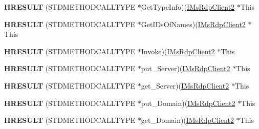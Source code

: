 \begin{DoxyCompactItemize}
{\bfseries H\+R\+E\+S\+U\+LT} (S\+T\+D\+M\+E\+T\+H\+O\+D\+C\+A\+L\+L\+T\+Y\+PE $\ast$Get\+Type\+Info)(\hyperlink{interface_m_s_t_s_c_lib_1_1_i_ms_rdp_client2}{I\+Ms\+Rdp\+Client2} $\ast$This
\item 
\mbox{\label{struct_m_s_t_s_c_lib_1_1_i_ms_rdp_client2_vtbl_aaee47cd5a7e23b764e80e9a08243ff5a}} 
{\bfseries H\+R\+E\+S\+U\+LT} (S\+T\+D\+M\+E\+T\+H\+O\+D\+C\+A\+L\+L\+T\+Y\+PE $\ast$Get\+I\+Ds\+Of\+Names)(\hyperlink{interface_m_s_t_s_c_lib_1_1_i_ms_rdp_client2}{I\+Ms\+Rdp\+Client2} $\ast$This
\item 
\mbox{\label{struct_m_s_t_s_c_lib_1_1_i_ms_rdp_client2_vtbl_a5ba6d3eae8ed0eeca2248aef7949bd52}} 
{\bfseries H\+R\+E\+S\+U\+LT} (S\+T\+D\+M\+E\+T\+H\+O\+D\+C\+A\+L\+L\+T\+Y\+PE $\ast$Invoke)(\hyperlink{interface_m_s_t_s_c_lib_1_1_i_ms_rdp_client2}{I\+Ms\+Rdp\+Client2} $\ast$This
\item 
\mbox{\label{struct_m_s_t_s_c_lib_1_1_i_ms_rdp_client2_vtbl_aab5809642581f36d23bfc2488d74fad4}} 
{\bfseries H\+R\+E\+S\+U\+LT} (S\+T\+D\+M\+E\+T\+H\+O\+D\+C\+A\+L\+L\+T\+Y\+PE $\ast$put\+\_\+\+Server)(\hyperlink{interface_m_s_t_s_c_lib_1_1_i_ms_rdp_client2}{I\+Ms\+Rdp\+Client2} $\ast$This
\item 
\mbox{\label{struct_m_s_t_s_c_lib_1_1_i_ms_rdp_client2_vtbl_aa299868fc3a59a6c72de00e0975ca85e}} 
{\bfseries H\+R\+E\+S\+U\+LT} (S\+T\+D\+M\+E\+T\+H\+O\+D\+C\+A\+L\+L\+T\+Y\+PE $\ast$get\+\_\+\+Server)(\hyperlink{interface_m_s_t_s_c_lib_1_1_i_ms_rdp_client2}{I\+Ms\+Rdp\+Client2} $\ast$This
\item 
\mbox{\label{struct_m_s_t_s_c_lib_1_1_i_ms_rdp_client2_vtbl_a4259dbeca0c47228948f047a723a168c}} 
{\bfseries H\+R\+E\+S\+U\+LT} (S\+T\+D\+M\+E\+T\+H\+O\+D\+C\+A\+L\+L\+T\+Y\+PE $\ast$put\+\_\+\+Domain)(\hyperlink{interface_m_s_t_s_c_lib_1_1_i_ms_rdp_client2}{I\+Ms\+Rdp\+Client2} $\ast$This
\item 
\mbox{\label{struct_m_s_t_s_c_lib_1_1_i_ms_rdp_client2_vtbl_a8a0922d61c129a968d8a70144117382a}} 
{\bfseries H\+R\+E\+S\+U\+LT} (S\+T\+D\+M\+E\+T\+H\+O\+D\+C\+A\+L\+L\+T\+Y\+PE $\ast$get\+\_\+\+Domain)(\hyperlink{interface_m_s_t_s_c_lib_1_1_i_ms_rdp_client2}{I\+Ms\+Rdp\+Client2} $\ast$This

\end{DoxyCompactItemize}
